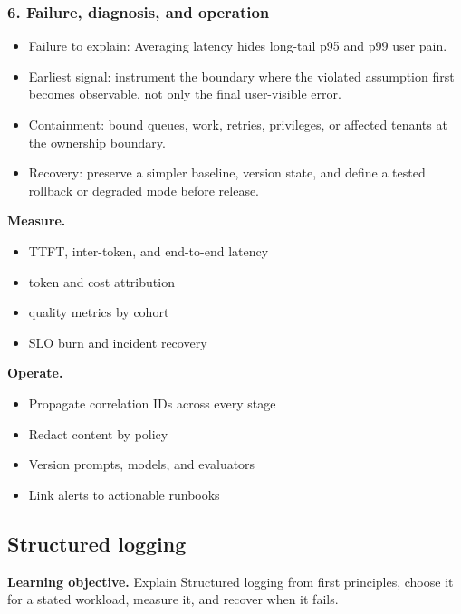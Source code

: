 \subsubsection*{6. Failure, diagnosis, and operation}
\begin{itemize}
\item Failure to explain: Averaging latency hides long-tail p95 and p99 user pain.
\item Earliest signal: instrument the boundary where the violated assumption first becomes observable, not only the final user-visible error.
\item Containment: bound queues, work, retries, privileges, or affected tenants at the ownership boundary.
\item Recovery: preserve a simpler baseline, version state, and define a tested rollback or degraded mode before release.
\end{itemize}
\textbf{Measure.}\begin{itemize}
\item TTFT, inter-token, and end-to-end latency
\item token and cost attribution
\item quality metrics by cohort
\item SLO burn and incident recovery
\end{itemize}
\textbf{Operate.}\begin{itemize}
\item Propagate correlation IDs across every stage
\item Redact content by policy
\item Version prompts, models, and evaluators
\item Link alerts to actionable runbooks
\end{itemize}
\subsection{Structured logging}
\textbf{Learning objective.} Explain Structured logging from first principles, choose it for a stated workload, measure it, and recover when it fails.
